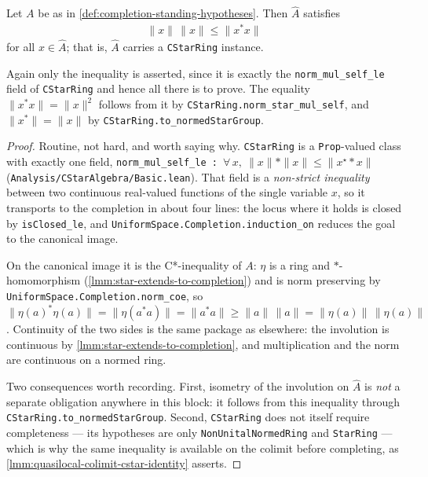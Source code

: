 \begin{lemma}
    \label{lmm:completion-cstar-identity}
    \leanok
    Let $A$ be as in \ref{def:completion-standing-hypotheses}. Then $\widehat{A}$ satisfies
    \begin{align}
        \|x\| \, \|x\| \le \|x^{*} x\|
    \end{align}
    for all $x \in \widehat{A}$; that is, $\widehat{A}$ carries a \texttt{CStarRing} instance.

    Again only the inequality is asserted, since it is exactly the \texttt{norm\_mul\_self\_le} field of \texttt{CStarRing} and hence all there is to prove. The equality $\|x^{*}x\| = \|x\|^{2}$ follows from it by \texttt{CStarRing.norm\_star\_mul\_self}, and $\|x^{*}\| = \|x\|$ by \texttt{CStarRing.to\_normedStarGroup}.
\end{lemma}
\begin{proof}
    \leanok
    Routine, not hard, and worth saying why. \texttt{CStarRing} is a \texttt{Prop}-valued class with exactly one field, \texttt{norm\_mul\_self\_le : \ensuremath{\forall\, x,\ \|x\| * \|x\| \le \|x^{\star} * x\|}} (\texttt{Analysis/CStarAlgebra/Basic.lean}). That field is a \emph{non-strict inequality} between two continuous real-valued functions of the single variable $x$, so it transports to the completion in about four lines: the locus where it holds is closed by \texttt{isClosed\_le}, and \texttt{UniformSpace.Completion.induction\_on} reduces the goal to the canonical image.

    On the canonical image it is the C*-inequality of $A$: $\eta$ is a ring and $*$-homomorphism (\ref{lmm:star-extends-to-completion}) and is norm preserving by \texttt{UniformSpace.Completion.norm\_coe}, so $\|\eta(a)^{*}\eta(a)\| = \|\eta(a^{*}a)\| = \|a^{*}a\| \ge \|a\|\,\|a\| = \|\eta(a)\|\,\|\eta(a)\|$. Continuity of the two sides is the same package as elsewhere: the involution is continuous by \ref{lmm:star-extends-to-completion}, and multiplication and the norm are continuous on a normed ring.

    Two consequences worth recording. First, isometry of the involution on $\widehat{A}$ is \emph{not} a separate obligation anywhere in this block: it follows from this inequality through \texttt{CStarRing.to\_normedStarGroup}. Second, \texttt{CStarRing} does not itself require completeness --- its hypotheses are only \texttt{NonUnitalNormedRing} and \texttt{StarRing} --- which is why the same inequality is available on the colimit before completing, as \ref{lmm:quasilocal-colimit-cstar-identity} asserts.
\end{proof}


